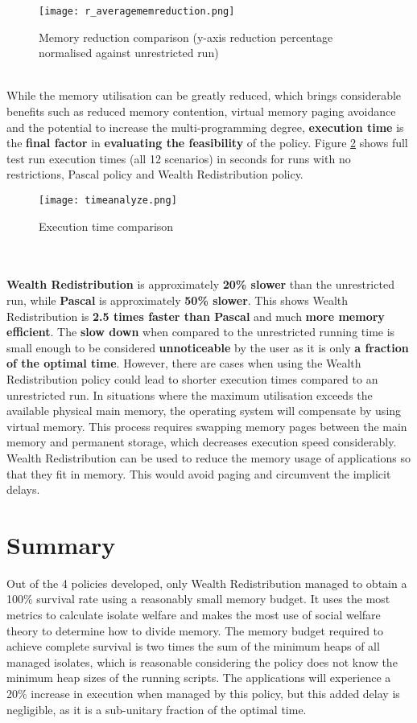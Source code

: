 \documentclass{l4proj}
\begin{document}
\begin{figure}[!ht]
  \centering
    \texttt{[image: r\_averagememreduction.png]}
    \caption{Memory reduction comparison (y-axis reduction percentage normalised against unrestricted run)}
    \label{pc_reduction}
\end{figure}\\
\hspace*{1em} While the memory utilisation can be greatly reduced, which brings considerable benefits such as reduced memory contention, virtual memory paging avoidance and the potential to increase the multi-programming degree, \textbf{execution time} is the \textbf{final factor} in \textbf{evaluating the feasibility} of the policy. Figure \ref{time_cmp} shows full test run execution times (all 12 scenarios) in seconds for runs with no restrictions, Pascal policy and Wealth Redistribution policy.
\begin{figure}[!ht]
  \centering
    \texttt{[image: timeanalyze.png]}
    \caption{Execution time comparison}
    \label{time_cmp}
\end{figure}\\\\
\hspace*{1em} \textbf{Wealth Redistribution} is approximately \textbf{20\% slower} than the unrestricted run, while \textbf{Pascal} is approximately \textbf{50\% slower}. This shows Wealth Redistribution is \textbf{2.5 times faster than Pascal} and much \textbf{more memory efficient}. The \textbf{slow down} when compared to the unrestricted running time is small enough to be considered \textbf{unnoticeable} by the user as it is only \textbf{a fraction of the optimal time}. However, there are cases when using the Wealth Redistribution policy could lead to shorter execution times compared to an unrestricted run. In situations where the maximum utilisation exceeds the available physical main memory, the operating system will compensate by using virtual memory. This process requires swapping memory pages between the main memory and permanent storage, which decreases execution speed considerably. Wealth Redistribution can be used to reduce the memory usage of applications so that they fit in memory. This would avoid paging and circumvent the implicit delays.

\section{Summary}
\hspace*{1em} Out of the 4 policies developed, only Wealth Redistribution managed to obtain a 100\% survival rate using a reasonably small memory budget. It uses the most metrics to calculate isolate welfare and makes the most use of social welfare theory to determine how to divide memory. The memory budget required to achieve complete survival is two times the sum of the minimum heaps of all managed isolates, which is reasonable considering the policy does not know the minimum heap sizes of the running scripts. The applications will experience a 20\% increase in execution when managed by this policy, but this added delay is negligible, as it is a sub-unitary fraction of the optimal time.
\end{document}
